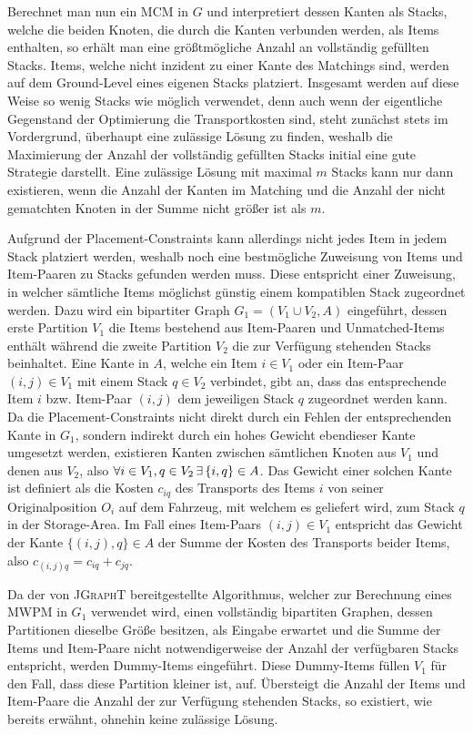 Berechnet man nun ein \textsc{MCM} in $G$ und interpretiert dessen Kanten als Stacks, welche die beiden Knoten, die durch
die Kanten verbunden werden, als Items enthalten, so erhält man eine größtmögliche Anzahl an vollständig gefüllten Stacks.
Items, welche nicht inzident zu einer Kante des Matchings sind, werden auf dem Ground-Level eines eigenen Stacks platziert.
Insgesamt werden auf diese Weise so wenig Stacks wie möglich verwendet, denn auch wenn der eigentliche Gegenstand der Optimierung die Transportkosten sind, steht zunächst stets im Vordergrund, überhaupt eine zulässige Lösung zu finden, weshalb die Maximierung der Anzahl der vollständig gefüllten Stacks initial eine gute Strategie darstellt.
Eine zulässige Lösung mit maximal $m$ Stacks kann nur dann existieren, wenn die Anzahl der Kanten im Matching und die Anzahl der nicht gematchten Knoten in der Summe nicht größer ist als $m$.

Aufgrund der Placement-Constraints kann allerdings nicht jedes Item in jedem Stack platziert werden, weshalb noch eine bestmögliche Zuweisung von Items und Item-Paaren zu Stacks gefunden werden muss. Diese entspricht einer Zuweisung, in welcher sämtliche Items möglichst günstig einem kompatiblen Stack zugeordnet werden. Dazu wird ein bipartiter Graph $G_1 = (V_1 \cup V_2, A)$ eingeführt, dessen erste Partition $V_1$ die Items bestehend aus Item-Paaren und Unmatched-Items enthält während die zweite Partition $V_2$ die zur Verfügung stehenden Stacks beinhaltet.
Eine Kante in $A$, welche ein Item $i \in V_1$ oder ein Item-Paar $(i, j) \in V_1$ mit einem Stack $q \in V_2$ verbindet, gibt an, dass das entsprechende Item $i$ bzw. Item-Paar $(i, j)$ dem jeweiligen Stack $q$ zugeordnet werden kann. Da die Placement-Constraints nicht direkt durch ein Fehlen der entsprechenden Kante in $G_1$, sondern indirekt durch ein hohes Gewicht ebendieser Kante umgesetzt werden, existieren Kanten zwischen sämtlichen Knoten
aus $V_1$ und denen aus $V_2$, also $\forall i \in V_1, q \in V_2 \thinspace \exists \thinspace \{i, q\} \in A$.
Das Gewicht einer solchen Kante ist definiert als die Kosten $c_{iq}$ des Transports des Items $i$ von seiner Originalposition $O_i$ auf dem Fahrzeug, mit welchem es geliefert wird, zum Stack $q$
in der Storage-Area. Im Fall eines Item-Paars $(i, j) \in V_1$ entspricht das
Gewicht der Kante $\{(i, j), q\} \in A$ der Summe der Kosten des Transports beider Items, also $c_{(i, j)q} = c_{iq} + c_{jq}$.

Da der von \textsc{JGraphT} bereitgestellte Algorithmus, welcher zur Berechnung eines \textsc{MWPM} in $G_1$ verwendet wird,
einen vollständig bipartiten Graphen, dessen Partitionen dieselbe Größe besitzen, als Eingabe erwartet und die Summe der Items und Item-Paare
nicht notwendigerweise der Anzahl der verfügbaren Stacks entspricht, werden Dummy-Items eingeführt.
Diese Dummy-Items füllen $V_1$ für den Fall, dass diese Partition kleiner ist, auf.
Übersteigt die Anzahl der Items und Item-Paare die Anzahl der zur Verfügung stehenden Stacks, so existiert,
wie bereits erwähnt, ohnehin keine zulässige Lösung.

